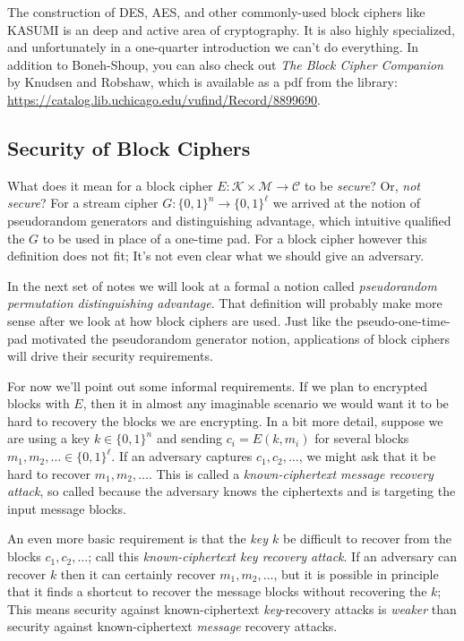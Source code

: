 \documentclass[11pt]{article}
\newcommand{\msgs}{\mathcal{M}}
\newcommand{\ctxts}{\mathcal{C}}
\newcommand{\keys}{\mathcal{K}}
\newcommand{\bits}{\{0,1\}}
\begin{document}
The construction of DES, AES, and other commonly-used block ciphers like KASUMI
is an deep and active area of cryptography. It is also highly specialized, and
unfortunately in a one-quarter introduction we can't do everything.  In
addition to Boneh-Shoup, you can also check out \emph{The Block Cipher
Companion} by Knudsen and Robshaw, which is available as a pdf from the
library: \url{https://catalog.lib.uchicago.edu/vufind/Record/8899690}.

\subsection{Security of Block Ciphers}

What does it mean for a block cipher $E:\keys\times\msgs\to\ctxts$ to be
\emph{secure}? Or, \emph{not secure}? For a stream cipher
$G:\bits^n\to\bits^\ell$ we arrived at the notion of pseudorandom generators and
distinguishing advantage, which intuitive qualified the $G$ to be used in place
of a one-time pad. For a block cipher however this definition does not fit;
It's not even clear what we should give an adversary.

In the next set of notes we will look at a formal a notion called
\emph{pseudorandom permutation distinguishing advantage}.  That definition will
probably make more sense after we look at how block ciphers are used. Just like
the pseudo-one-time-pad motivated the pseudorandom generator notion,
applications of block ciphers will drive their security requirements.

For now we'll point out some informal requirements. If we plan to encrypted
blocks with $E$, then it in almost any imaginable scenario we would want it to
be hard to recovery the blocks we are encrypting.  In a bit more detail, suppose
we are using a key $k\in\bits^n$ and sending $c_i = E(k,m_i)$ for several
blocks $m_1,m_2,\ldots\in\bits^\ell$. If an adversary captures
$c_1,c_2,\ldots$, we might ask that it be hard to recover $m_1,m_2,\ldots$.
This is called a \emph{known-ciphertext message recovery attack}, so called
because the adversary knows the ciphertexts and is targeting the input message
blocks.

An even more basic requirement is that the \emph{key $k$} be difficult to
recover from the blocks $c_1,c_2,\ldots$; call this \emph{known-ciphertext key
recovery attack}. If an adversary can recover $k$ then it can certainly recover
$m_1,m_2,\ldots$, but it is possible in principle that it finds a shortcut to
recover the message blocks without recovering the $k$; This means security
against known-ciphertext \emph{key}-recovery attacks is \emph{weaker} than
security against known-ciphertext \emph{message} recovery attacks. 
\end{document}
